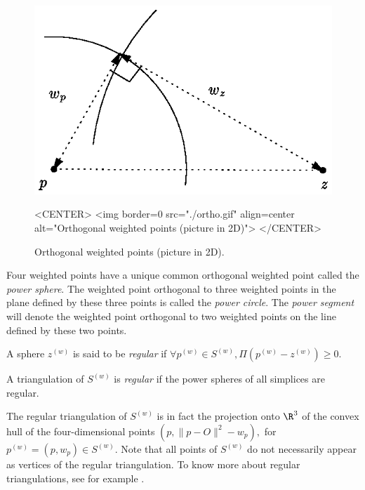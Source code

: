 \begin{figure}[htbp]
\begin{ccTexOnly}
\begin{center} 
\includegraphics{ortho.eps} 
\end{center}
\end{ccTexOnly}
\caption{Orthogonal weighted points (picture in 2D).
\label{Triangulation3-fig-ortho}}
\begin{ccHtmlOnly}
<CENTER>
<img border=0 src="./ortho.gif" align=center alt="Orthogonal weighted
points (picture in 2D)"> 
</CENTER>
\end{ccHtmlOnly}
\end{figure} 

Four weighted points have a unique common orthogonal weighted point
called the \textit{power sphere}.  The weighted point orthogonal to
three weighted points in the plane defined by these three points is
called the \textit{power circle}. The
\textit{power segment} will denote the weighted point orthogonal to
two weighted points on the line defined by these two points.

A sphere ${z}^{(w)}$ is said to be
\textit{regular} if $\forall {p}^{(w)}\in{S}^{(w)},
\Pi{({p}^{(w)}-{z}^{(w)})}\geq 0$.

A triangulation of ${S}^{(w)}$ is \textit{regular} if the power spheres
of all simplices are regular. 

The regular triangulation of
${S}^{(w)}$ is in fact the projection onto $\R^3$ of the convex hull 
of the four-dimensional points $(p,\|p-O\|^2-w_p),$ for
${p}^{(w)}=(p,w_p)\in{S}^{(w)}$. 
Note that all points of ${S}^{(w)}$ do not
necessarily appear as vertices of the regular
triangulation. To know more about regular triangulations, see for
example \cite{es-itfwr-96}. 

